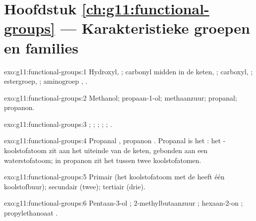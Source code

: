 \section*{Hoofdstuk \ref{ch:g11:functional-groups} --- Karakteristieke groepen en families}

\begin{solution}{exo:g11:functional-groups:1}
Hydroxyl, ; carbonyl midden in de keten, ; carboxyl,
; estergroep, ; aminogroep , .
\end{solution}

\begin{solution}{exo:g11:functional-groups:2}
Methanol; propaan-1-ol; methaanzuur; propanal; propanon.
\end{solution}

\begin{solution}{exo:g11:functional-groups:3}
; ; ; ; ; .
\end{solution}

\begin{solution}{exo:g11:functional-groups:4}
Propanal , propanon . Propanal is het
: het -koolstofatoom zit aan het uiteinde van de keten,
gebonden aan een waterstofatoom; in propanon zit het tussen twee
koolstofatomen.
\end{solution}

\begin{solution}{exo:g11:functional-groups:5}
Primair (het koolstofatoom met de  heeft één koolstofbuur);
secundair (twee); tertiair (drie).
\end{solution}

\begin{solution}{exo:g11:functional-groups:6}
Pentaan-3-ol ;
2-methylbutaanzuur ;
hexaan-2-on ;
propylethanoaat .
\end{solution}

